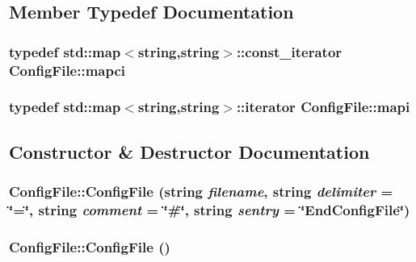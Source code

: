 \subsection{Member Typedef Documentation}
\hypertarget{classConfigFile_af606aa032e366450b81792da67c984fc}{
\subsubsection[{mapci}]{\setlength{\rightskip}{0pt plus 5cm}typedef std::map$<$string,string$>$::const\_\-iterator {\bf ConfigFile::mapci}}}
\label{classConfigFile_af606aa032e366450b81792da67c984fc}
\hypertarget{classConfigFile_a91de4778982f558673be7465f33750f5}{
\subsubsection[{mapi}]{\setlength{\rightskip}{0pt plus 5cm}typedef std::map$<$string,string$>$::iterator {\bf ConfigFile::mapi}}}
\label{classConfigFile_a91de4778982f558673be7465f33750f5}


\subsection{Constructor \& Destructor Documentation}
\hypertarget{classConfigFile_a2690c3c6b72869b65d168791b28264dc}{
\subsubsection[{ConfigFile}]{\setlength{\rightskip}{0pt plus 5cm}ConfigFile::ConfigFile (string {\em filename}, \/  string {\em delimiter} = {\ttfamily \char`\"{}=\char`\"{}}, \/  string {\em comment} = {\ttfamily \char`\"{}\#\char`\"{}}, \/  string {\em sentry} = {\ttfamily \char`\"{}EndConfigFile\char`\"{}})}}
\label{classConfigFile_a2690c3c6b72869b65d168791b28264dc}
\hypertarget{classConfigFile_a9ce259defdfaabeedb2455849ca6bd1e}{
\subsubsection[{ConfigFile}]{\setlength{\rightskip}{0pt plus 5cm}ConfigFile::ConfigFile ()}}
\label{classConfigFile_a9ce259defdfaabeedb2455849ca6bd1e}


